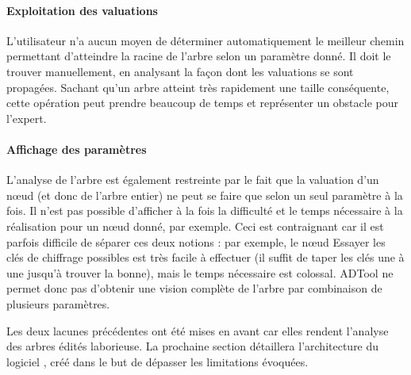     \paragraph{Exploitation des valuations} L'utilisateur n'a aucun moyen de déterminer automatiquement le \og meilleur chemin \fg{} permettant d'atteindre la racine de l'arbre selon un paramètre donné. Il doit le trouver manuellement, en analysant la façon dont les valuations se sont propagées. Sachant qu'un arbre atteint très rapidement une taille conséquente, cette opération peut prendre beaucoup de temps et représenter un obstacle pour l'expert.

    \paragraph{Affichage des paramètres} L'analyse de l'arbre est également restreinte par le fait que la valuation d'un nœud (et donc de l'arbre entier) ne peut se faire que selon un seul paramètre à la fois. Il n'est pas possible d'afficher à la fois la \og difficulté \fg{} et le \og temps nécessaire \fg{} à la réalisation pour un nœud donné, par exemple. Ceci est contraignant car il est parfois difficile de séparer ces deux notions : par exemple, le nœud \og Essayer les clés de chiffrage possibles \fg{} est très facile à effectuer (il suffit de taper les clés une à une jusqu'à trouver la bonne), mais le temps nécessaire est colossal. ADTool ne permet donc pas d'obtenir une vision complète de l'arbre par combinaison de plusieurs paramètres.

    Les deux lacunes précédentes ont été mises en avant car elles rendent l'analyse des arbres édités laborieuse. La prochaine section détaillera l'architecture du logiciel \glasir{}, créé dans le but de dépasser les limitations évoquées.